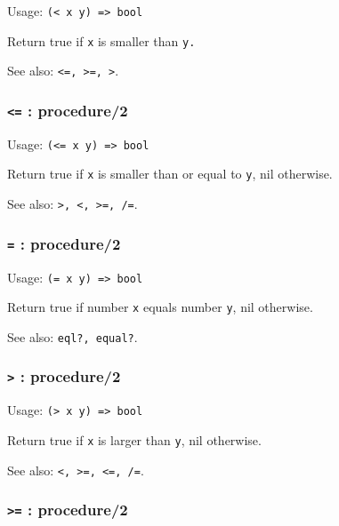 \documentclass[
]{article}
\newcommand{\passthrough}[1]{#1}
\begin{document}
Usage: \passthrough{\lstinline!(< x y) => bool!}

Return true if \passthrough{\lstinline!x!} is smaller than
\passthrough{\lstinline!y.!}

See also: \passthrough{\lstinline!<=, >=, >!}.

\hypertarget{procedure2-3}{%
\subsubsection{\texorpdfstring{\texttt{\textless{}=} :
procedure/2}{\textless= : procedure/2}}\label{procedure2-3}}

Usage: \passthrough{\lstinline!(<= x y) => bool!}

Return true if \passthrough{\lstinline!x!} is smaller than or equal to
\passthrough{\lstinline!y!}, nil otherwise.

See also: \passthrough{\lstinline!>, <, >=, /=!}.

\hypertarget{procedure2-4}{%
\subsubsection{\texorpdfstring{\texttt{=} :
procedure/2}{= : procedure/2}}\label{procedure2-4}}

Usage: \passthrough{\lstinline!(= x y) => bool!}

Return true if number \passthrough{\lstinline!x!} equals number
\passthrough{\lstinline!y!}, nil otherwise.

See also: \passthrough{\lstinline!eql?, equal?!}.

\hypertarget{procedure2-5}{%
\subsubsection{\texorpdfstring{\texttt{\textgreater{}} :
procedure/2}{\textgreater{} : procedure/2}}\label{procedure2-5}}

Usage: \passthrough{\lstinline!(> x y) => bool!}

Return true if \passthrough{\lstinline!x!} is larger than
\passthrough{\lstinline!y!}, nil otherwise.

See also: \passthrough{\lstinline!<, >=, <=, /=!}.

\hypertarget{procedure2-6}{%
\subsubsection{\texorpdfstring{\texttt{\textgreater{}=} :
procedure/2}{\textgreater= : procedure/2}}\label{procedure2-6}}
\end{document}
